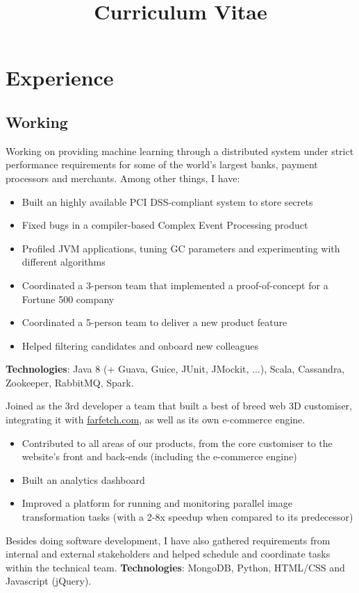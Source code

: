 \documentclass[11pt,a4paper]{moderncv}
\title{Curriculum Vitae}
\begin{document}
\maketitle

\vspace{-10mm}

\section{Experience}
\vspace{-2mm}
\subsection{Working}
{Working on providing machine learning through a distributed system under strict performance requirements for some of the world's largest banks, payment processors and merchants.
Among other things, I have:
\begin{itemize}
  \item Built an highly available PCI DSS-compliant system to store secrets
  \item Fixed bugs in a compiler-based Complex Event Processing product
  \item Profiled JVM applications, tuning GC parameters and experimenting with different algorithms
  \item Coordinated a 3-person team that implemented a proof-of-concept for a Fortune 500 company
  \item Coordinated a 5-person team to deliver a new product feature
  \item Helped filtering candidates and onboard new colleagues
\end{itemize}
\textbf{Technologies}: Java 8 (+ Guava, Guice, JUnit, JMockit, ...), Scala, Cassandra, Zookeeper, RabbitMQ, Spark.}
{Joined as the 3rd developer a team that built a best of breed web 3D customiser,
integrating it with \href{https://www.farfetch.com/}{farfetch.com}, as well as
its own e-commerce engine.
\begin{itemize}
  \item Contributed to all areas of our products, from the core
  customiser to the website's front and back-ends (including the e-commerce engine)
  \item Built an analytics dashboard
  \item Improved a platform for running and monitoring parallel image transformation tasks
  (with a 2-8x speedup when compared to its predecessor)
\end{itemize}
Besides doing software development, I have also gathered requirements from internal and external
stakeholders and helped schedule and coordinate tasks within the technical team. \textbf{Technologies}: MongoDB, Python, HTML/CSS and Javascript (jQuery).
}
\end{document}
